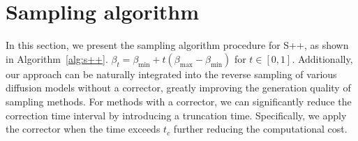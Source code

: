 \documentclass{article}
\begin{document}
\begin{table}[!t]
\caption{Experimental parameters for sampling methods with a corrector (WC).}\label{tab:wc_ex_details}\vspace{-3mm}
\centering
{}
\end{table}
\section{Sampling algorithm}\label{appendix:C.Added Experiment}
In this section, we present the sampling algorithm procedure for S++, as shown in Algorithm~\ref{alg:s++}. $\beta_{t}=\beta_{\min}+t(\beta_{\max}-\beta_{\min})$ for $t\in[0,1]$. Additionally, our approach can be naturally integrated into the reverse sampling of various diffusion models without a corrector, greatly improving the generation quality of sampling methods. For methods with a corrector, we can significantly reduce the correction time interval by introducing a truncation time. Specifically, we apply the corrector when the time exceeds $t_c$ further reducing the computational cost.
\end{document}
